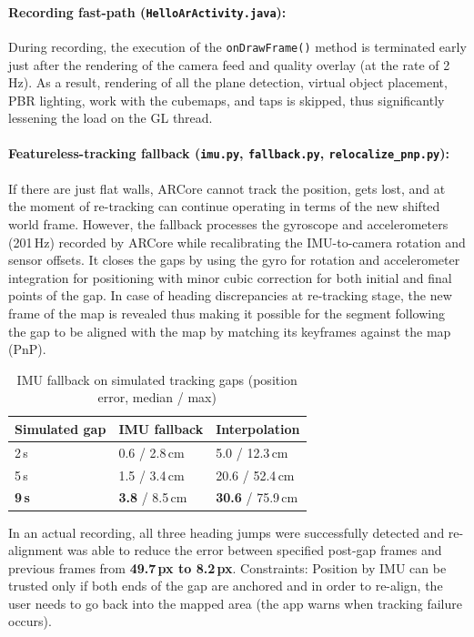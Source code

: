 \paragraph{Recording fast-path (\texttt{HelloArActivity.java}):} During recording, the execution of the \texttt{onDrawFrame()} method is terminated early just after the rendering of the camera feed and quality overlay (at the rate of 2\,Hz). As a result, rendering of all the plane detection, virtual object placement, PBR lighting, work with the cubemaps, and taps is skipped, thus significantly lessening the load on the GL thread.

\paragraph{Featureless-tracking fallback (\texttt{imu.py}, \texttt{fallback.py}, \texttt{relocalize\_pnp.py}):} If there are just flat walls, ARCore cannot track the position, gets lost, and at the moment of re-tracking can continue operating in terms of the new shifted world frame. However, the fallback processes the gyroscope and accelerometers (201\,Hz) recorded by ARCore while recalibrating the IMU-to-camera rotation and sensor offsets. It closes the gaps by using the gyro for rotation and accelerometer integration for positioning with minor cubic correction for both initial and final points of the gap. In case of heading discrepancies at re-tracking stage, the new frame of the map is revealed thus making it possible for the segment following the gap to be aligned with the map by matching its keyframes against the map (PnP).

\begin{table}[htbp]
\centering
\caption{IMU fallback on simulated tracking gaps (position error, median / max)}
\label{tab:imufallback}
\begin{tabular}{p{2.2cm}p{3.6cm}p{3.6cm}}
\toprule
\textbf{Simulated gap} & \textbf{IMU fallback} & \textbf{Interpolation} \\
\midrule
2\,s & 0.6 / 2.8\,cm & 5.0 / 12.3\,cm \\
5\,s & 1.5 / 3.4\,cm & 20.6 / 52.4\,cm \\
\textbf{9\,s} & \textbf{3.8} / 8.5\,cm & \textbf{30.6} / 75.9\,cm \\
\bottomrule
\end{tabular}
\end{table}

In an actual recording, all three heading jumps were successfully detected and re-alignment was able to reduce the error between specified post-gap frames and previous frames from \textbf{49.7\,px to 8.2\,px}. Constraints: Position by IMU can be trusted only if both ends of the gap are anchored and in order to re-align, the user needs to go back into the mapped area (the app warns when tracking failure occurs).


